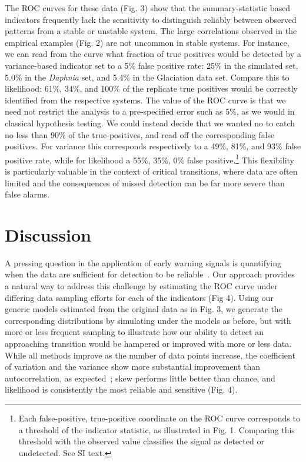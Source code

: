 \documentclass{pnastwo}
\begin{document}
\begin{article}
The ROC curves for these data (Fig. 3) show that the summary-statistic based indicators 
frequently lack the sensitivity to distinguish reliably between observed patterns from a stable or unstable system. 
The large correlations observed in the empirical examples (Fig. 2) are not uncommon in stable systems. 
For instance, we can read from the curve what fraction of true positives would be detected by a variance-based indicator
set to a 5\% false positive rate:
25\% in the simulated set,
5.0\% in the \emph{Daphnia} set,
and 5.4\% in the Glaciation data set.
Compare this to likelihood: 61\%, 34\%, and 100\% of the replicate true positives
would be correctly identified from the respective systems.
The value of the ROC curve is that we need not restrict the analysis to a pre-specified error such as 5\%,
as we would in classical hypothesis testing.  
We could instead decide that we wanted no to catch no less than 90\% of the true-positives,
and read off the corresponding false positives.  
For variance this corresponds respectively to a 49\%, 81\%, and 93\% false positive rate,
while for likelihood a 55\%, 35\%, 0\% false positive.\footnote{
Each false-positive, true-positive coordinate on the ROC curve corresponds to a threshold of the indicator statistic,
as illustrated in Fig. 1.  
Comparing this threshold with the observed value classifies the signal as detected or undetected.  See SI text.}
This flexibility is particularly valuable in the context of critical transitions, 
where data are often limited and the consequences of missed detection can be far more severe than false alarms.  



\section{Discussion}
A pressing question in the application of early warning signals is quantifying
when the data are sufficient for detection to be reliable~\cite{Scheffer2009, Scheffer2010, Inman2011}. 
Our approach provides a natural way to address this challenge by estimating the ROC curve under differing data sampling efforts
for each of the indicators (Fig 4). 
Using our generic models estimated from the original data as in Fig. 3, 
we generate the corresponding distributions by simulating under the models as before, 
but with more or less frequent sampling to illustrate how our ability to detect an approaching transition 
would be hampered or improved with more or less data.  
While all methods improve as the number of data points increase, 
the coefficient of variation and the variance show more substantial improvement than autocorrelation, 
as expected~\cite{Carpenter2011};⁠
skew performs little better than chance, and likelihood is consistently the most reliable and sensitive (Fig. 4). 


\end{article}
\end{document}
